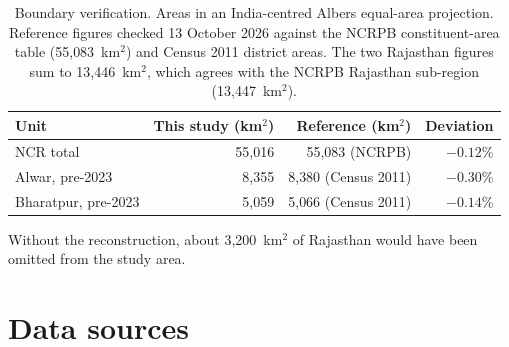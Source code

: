 \documentclass[11pt,a4paper]{article}
\begin{document}
\begin{table}[H]
\centering\small
\begin{tabular}{@{}lrrr@{}}
\toprule
Unit & This study (km$^2$) & Reference (km$^2$) & Deviation \\
\midrule
NCR total              & 55{,}016 & 55{,}083 (NCRPB)       & $-0.12$\% \\
Alwar, pre-2023        &  8{,}355 &  8{,}380 (Census 2011) & $-0.30$\% \\
Bharatpur, pre-2023    &  5{,}059 &  5{,}066 (Census 2011) & $-0.14$\% \\
\bottomrule
\end{tabular}
\caption{Boundary verification. Areas in an India-centred Albers equal-area
projection. Reference figures checked 13 October 2026 against the NCRPB
constituent-area table (55{,}083~km$^2$) and Census 2011 district areas. The two
Rajasthan figures sum to 13{,}446~km$^2$, which agrees with the NCRPB Rajasthan
sub-region (13{,}447~km$^2$).}
\end{table}

Without the reconstruction, about 3{,}200~km$^2$ of Rajasthan would have been
omitted from the study area.

\section{Data sources}
\end{document}

